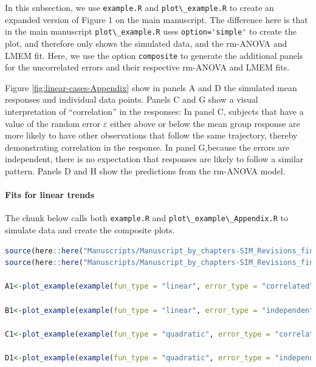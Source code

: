 \documentclass[
]{article}
\newcommand{\passthrough}[1]{#1}
\begin{document}
In this subsection, we use \passthrough{\lstinline!example.R!} and \passthrough{\lstinline!plot\_example.R!} to create an expanded version of Figure 1 on the main manuscript. The difference here is that in the main manuscript \passthrough{\lstinline!plot\_example.R!} uses \passthrough{\lstinline!option='simple'!} to create the plot, and therefore only shows the simulated data, and the rm-ANOVA and LMEM fit. Here, we use the option \passthrough{\lstinline!composite!} to generate the additional panels for the uncorrelated errors and their respective rm-ANOVA and LMEM fits.

Figure \ref{fig:linear-cases-Appendix} show in panels A and D the simulated mean responses and individual data points. Panels C and G show a visual interpretation of ``correlation'' in the responses: In panel C, subjects that have a value of the random error \(\varepsilon\) either above or below the mean group response are more likely to have other observations that follow the same trajectory, thereby demonstrating correlation in the response. In panel G,because the errors are independent, there is no expectation that responses are likely to follow a similar pattern. Panels D and H show the predictions from the rm-ANOVA model.

\hypertarget{fits-for-linear-trends}{%
\paragraph{Fits for linear trends}\label{fits-for-linear-trends}}

The chunk below calls both \passthrough{\lstinline!example.R!} and \passthrough{\lstinline!plot\_example\_Appendix.R!} to simulate data and create the composite plots.

\begin{lstlisting}[language=R]
source(here::here("Manuscripts/Manuscript_by_chapters-SIM_Revisions_final/scripts","example.R"))
source(here::here("Manuscripts/Manuscript_by_chapters-SIM_Revisions_final/scripts","plot_example.R"))

A1<-plot_example(example(fun_type = "linear", error_type = "correlated"),option='composite') 

B1<-plot_example(example(fun_type = "linear", error_type = "independent"),option='composite') 
  
C1<-plot_example(example(fun_type = "quadratic", error_type = "correlated"),option='composite') 
  
D1<-plot_example(example(fun_type = "quadratic", error_type = "independent"),option='composite') 
\end{lstlisting}
\end{document}
